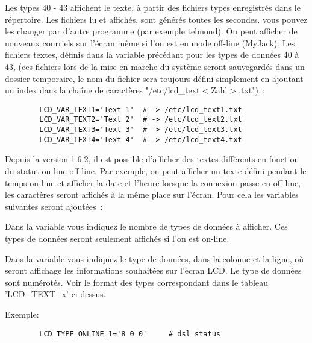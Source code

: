 \begin{description}
      Les types 40 - 43 affichent le texte, à partir des fichiers types enregistrés
      dans le répertoire. Les fichiers lu et affichés, sont générés toutes les
      secondes. vous pouvez les changer par d'autre programme (par exemple telmond).
      On peut afficher de nouveaux courriels sur l'écran même si l'on est en mode
      off-line (MyJack). Les fichiers textes, définis dans la variable précédant
      pour les types de données 40 à 43, (ces fichiers lors de la mise en marche
      du système seront sauvegardés dans un dossier temporaire, le nom du fichier
      sera toujours défini simplement en ajoutant un index dans la chaîne de
      caractères "/etc/lcd\_text$<$Zahl$>$.txt")~:

\begin{example}
\begin{verbatim}
        LCD_VAR_TEXT1='Text 1'  # -> /etc/lcd_text1.txt
        LCD_VAR_TEXT2='Text 2'  # -> /etc/lcd_text2.txt
        LCD_VAR_TEXT3='Text 3'  # -> /etc/lcd_text3.txt
        LCD_VAR_TEXT4='Text 4'  # -> /etc/lcd_text4.txt
\end{verbatim}
\end{example}

    Depuis la version 1.6.2, il est possible d'afficher des textes différents en
    fonction du statut on-line off-line. Par exemple, on peut afficher un texte
    défini pendant le temps on-line et afficher la date et l'heure lorsque la
    connexion passe en off-line, les caractères seront affichés à la même place
    sur l'écran. Pour cela les variables suivantes seront ajoutées~:


     Dans la variable  vous indiquez le nombre
     de types de données à afficher. Ces types de données seront seulement
     affichés si l'on est on-line.



      Dans la variable  vous indiquez le type
      de données, dans la colonne et la ligne, où seront affichage les informations
      souhaitées sur l'écran LCD. Le type de données sont numérotés. Voir le
      format des types correspondant dans le tableau 'LCD\_TEXT\_x' ci-dessus.

      Exemple:
\begin{example}
\begin{verbatim}
        LCD_TYPE_ONLINE_1='8 0 0'     # dsl status
\end{verbatim}
\end{example}



\end{description}
